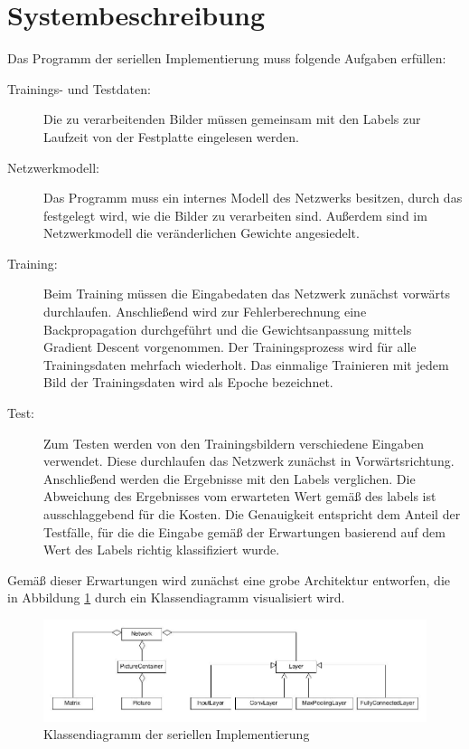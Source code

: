 \documentclass[../main.tex]{subfiles}
\begin{document}
\section{Systembeschreibung}
Das Programm der seriellen Implementierung muss folgende Aufgaben erfüllen: 
\begin{description}
\item[Trainings- und Testdaten:] Die zu verarbeitenden Bilder müssen gemeinsam mit den Labels zur Laufzeit von der Festplatte eingelesen werden. 
\item[Netzwerkmodell:] Das Programm muss ein internes Modell des Netzwerks besitzen, durch das festgelegt wird, wie die Bilder zu verarbeiten sind. Außerdem sind im Netzwerkmodell die veränderlichen Gewichte angesiedelt. 
\item[Training:] Beim Training müssen die Eingabedaten das Netzwerk zunächst vorwärts durchlaufen. Anschließend wird zur Fehlerberechnung eine Backpropagation durchgeführt und die Gewichtsanpassung mittels Gradient Descent vorgenommen. 
Der Trainingsprozess wird für alle Trainingsdaten mehrfach wiederholt. Das einmalige Trainieren mit jedem Bild der Trainingsdaten wird als Epoche bezeichnet. 
\item[Test:] Zum Testen werden von den Trainingsbildern verschiedene Eingaben verwendet. Diese durchlaufen das Netzwerk zunächst in Vorwärtsrichtung. Anschließend werden die Ergebnisse mit den Labels verglichen. Die Abweichung des Ergebnisses vom erwarteten Wert gemäß des labels ist ausschlaggebend für die Kosten. Die Genauigkeit entspricht dem Anteil der Testfälle, für die die Eingabe gemäß der Erwartungen basierend auf dem Wert des Labels richtig klassifiziert wurde. 
\end{description}
Gemäß dieser Erwartungen wird zunächst eine grobe Architektur entworfen, die in Abbildung \ref{pic:cnn_serial_classes} durch ein Klassendiagramm visualisiert wird. 
\begin{figure}
    \centering 
       \includegraphics[width=\textwidth]{../images/Schmidt/CNN_Serial_Classes.jpg} 
    \caption {Klassendiagramm der seriellen Implementierung} 
    \label{pic:cnn_serial_classes} 
\end{figure} 
\end{document}
